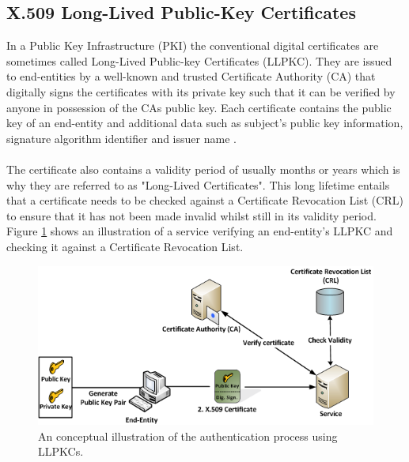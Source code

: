\subsection{X.509 Long-Lived Public-Key Certificates} \label{LLPKC}
In a Public Key Infrastructure (PKI) the conventional digital certificates are sometimes called Long-Lived Public-key Certificates (LLPKC). They are issued to end-entities by a well-known and trusted Certificate Authority (CA) that digitally signs the certificates with its private key such that it can be verified by anyone in possession of the CAs public key. Each certificate contains the public key of an end-entity and additional data such as subject's public key information, signature algorithm identifier and issuer name \cite{stallings2006cryptography}. 
\\\\
The certificate also contains a validity period of usually months or years which is why they are referred to as "Long-Lived Certificates". This long lifetime entails that a certificate needs to be checked against a Certificate Revocation List (CRL) to ensure that it has not been made invalid whilst still in its validity period. Figure \ref{fig:LLPKC} shows an illustration of a service verifying an end-entity's LLPKC and checking it against a Certificate Revocation List.

\begin{figure}[ht]
	\centering
		\includegraphics{images/LLPKC.png}
	\caption{An conceptual illustration of the authentication process using LLPKCs.}
	\label{fig:LLPKC}
\end{figure} 

